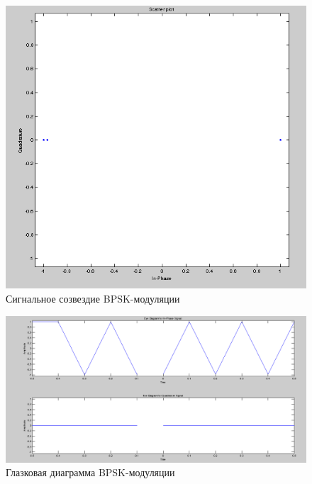 \begin{figure}[H]
   \includegraphics[width=150mm, scale = 0.9]{lab9/9_1}
   \caption{Сигнальное созвездие BPSK-модуляции}
\end{figure}

\begin{figure}[H]
   \includegraphics[width=150mm, scale = 0.9]{lab9/9_2}
   \caption{Глазковая диаграмма BPSK-модуляции}
\end{figure}




